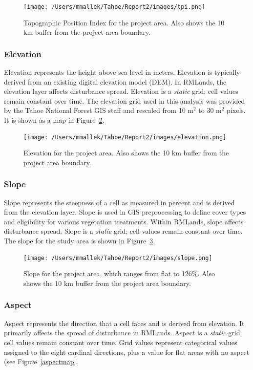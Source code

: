 \begin{figure}[htbp]
\centering
\texttt{[image: /Users/mmallek/Tahoe/Report2/images/tpi.png]}
\caption{Topographic Position Index for the project area. Also shows the 10 km buffer from the project area boundary.} 
\label{tpimap}
\end{figure}

\subsubsection{Elevation} 
Elevation represents the height above sea level in meters. Elevation is typically derived from an existing digital elevation model (DEM). In RMLands, the elevation layer affects disturbance spread.  Elevation is a \emph{static} grid; cell values remain constant over time. The elevation grid used in this analysis was provided by the Tahoe National Forest GIS staff and rescaled from 10 m$^2$ to 30 m$^2$ pixels. It is shown as a map in Figure~\ref{elevationmap}.

\begin{figure}[htbp]
\centering
\texttt{[image: /Users/mmallek/Tahoe/Report2/images/elevation.png]}
\caption{Elevation for the project area. Also shows the 10 km buffer from the project area boundary.} 
\label{elevationmap}
\end{figure}

\subsubsection{Slope} 
Slope represents the steepness of a cell as measured in percent and is derived from the elevation layer. Slope is used in GIS preprocessing to define cover types and eligibility for various vegetation treatments. Within RMLands, slope affects disturbance spread. Slope is a \emph{static} grid; cell values remain constant over time. The slope for the study area is shown in Figure~\ref{slopemap}.

\begin{figure}[htbp]
\centering
\texttt{[image: /Users/mmallek/Tahoe/Report2/images/slope.png]}
\caption{Slope for the project area, which ranges from flat to 126\%. Also shows the 10 km buffer from the project area boundary.} 
\label{slopemap}
\end{figure}

\subsubsection{Aspect} Aspect represents the direction that a cell faces and is derived from elevation. It primarily affects the spread of disturbance in RMLands. Aspect is a \emph{static} grid; cell values remain constant over time. Grid values represent categorical values assigned to the eight cardinal directions, plus a value for flat areas with no aspect (see Figure~\ref{aspectmap}. 

